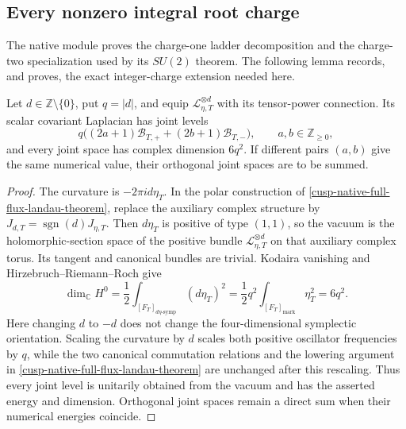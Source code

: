 \subsection{Every nonzero integral root charge}

The native module proves the charge-one ladder decomposition and the
charge-two specialization used by its \(SU(2)\) theorem.  The following
lemma records, and proves, the exact integer-charge extension needed here.

\begin{lemma}
\label{cusp-native-full-flux-suN-charge-d-Landau}
Let \(d\in\mathbb Z\setminus\{0\}\), put \(q=|d|\), and equip
\(\mathscr L_{\eta,T}^{\otimes d}\) with its tensor-power connection.  Its
scalar covariant Laplacian has joint levels
\begin{equation}
 q\bigl((2a+1)\mathcal B_{T,+}+(2b+1)\mathcal B_{T,-}\bigr),
 \qquad a,b\in\mathbb Z_{\ge0},
 \label{cusp-native-full-flux-suN-charge-d-levels}
\end{equation}
and every joint space has complex dimension \(6q^2\).  If different pairs
\((a,b)\) give the same numerical value, their orthogonal joint spaces are
to be summed.
\end{lemma}

\begin{proof}
The curvature is \(-2\pi i d\eta_T\).  In the polar construction of
\cref{cusp-native-full-flux-landau-theorem}, replace the auxiliary complex
structure by
\(J_{d,T}=\operatorname{sgn}(d)J_{\eta,T}\).  Then \(d\eta_T\) is positive
of type \((1,1)\), so the vacuum is the holomorphic-section space of the
positive bundle \(\mathscr L_{\eta,T}^{\otimes d}\) on that auxiliary
complex torus.  Its tangent and canonical bundles are trivial.  Kodaira
vanishing and Hirzebruch--Riemann--Roch give
\[
 \dim_{\mathbb C}H^0
 =\frac12\int_{[F_T]_{d\eta\text{-}\mathrm{symp}}}(d\eta_T)^2
 =\frac12q^2\int_{[F_T]_{\mathrm{mark}}}\eta_T^2
 =6q^2.
\]
Here changing \(d\) to \(-d\) does not change the four-dimensional
symplectic orientation.  Scaling the curvature by \(d\) scales both
positive oscillator frequencies by \(q\), while the two canonical
commutation relations and the lowering argument in
\cref{cusp-native-full-flux-landau-theorem} are unchanged after this
rescaling.  Thus every joint level is unitarily obtained from the vacuum and
has the asserted energy and dimension.  Orthogonal joint spaces remain a
direct sum when their numerical energies coincide.
\end{proof}

